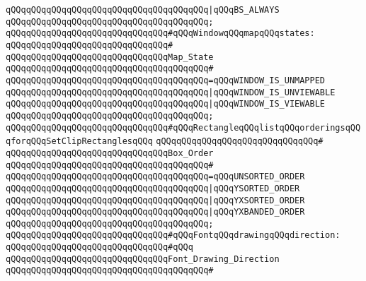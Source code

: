 \verb|qQQqqQQqqQQqqQQqqQQqqQQqqQQqqQQqqQQqqQQq|\verb#|qQQqBS_ALWAYS#\newline
\verb|qQQqqQQqqQQqqQQqqQQqqQQqqQQqqQQqqQQqqQQq;|\newline
\newline
\verb|qQQqqQQqqQQqqQQqqQQqqQQqqQQqqQQq#qQQqWindowqQQqmapqQQqstates:|\newline
\verb|qQQqqQQqqQQqqQQqqQQqqQQqqQQqqQQq#|\newline
\verb|qQQqqQQqqQQqqQQqqQQqqQQqqQQqqQQqMap_State|\newline
\verb|qQQqqQQqqQQqqQQqqQQqqQQqqQQqqQQqqQQqqQQq#|\newline
\verb|qQQqqQQqqQQqqQQqqQQqqQQqqQQqqQQqqQQqqQQq=qQQqWINDOW_IS_UNMAPPED|\newline
\verb|qQQqqQQqqQQqqQQqqQQqqQQqqQQqqQQqqQQqqQQq|\verb#|qQQqWINDOW_IS_UNVIEWABLE#\newline
\verb|qQQqqQQqqQQqqQQqqQQqqQQqqQQqqQQqqQQqqQQq|\verb#|qQQqWINDOW_IS_VIEWABLE#\newline
\verb|qQQqqQQqqQQqqQQqqQQqqQQqqQQqqQQqqQQqqQQq;|\newline
\newline
\verb|qQQqqQQqqQQqqQQqqQQqqQQqqQQqqQQq#qQQqRectangleqQQqlistqQQqorderingsqQQqforqQQqSetClipRectanglesqQQq|\newline
\verb|qQQqqQQqqQQqqQQqqQQqqQQqqQQqqQQq#|\newline
\verb|qQQqqQQqqQQqqQQqqQQqqQQqqQQqqQQqBox_Order|\newline
\verb|qQQqqQQqqQQqqQQqqQQqqQQqqQQqqQQqqQQqqQQq#|\newline
\verb|qQQqqQQqqQQqqQQqqQQqqQQqqQQqqQQqqQQqqQQq=qQQqUNSORTED_ORDER|\newline
\verb|qQQqqQQqqQQqqQQqqQQqqQQqqQQqqQQqqQQqqQQq|\verb#|qQQqYSORTED_ORDER#\newline
\verb|qQQqqQQqqQQqqQQqqQQqqQQqqQQqqQQqqQQqqQQq|\verb#|qQQqYXSORTED_ORDER#\newline
\verb|qQQqqQQqqQQqqQQqqQQqqQQqqQQqqQQqqQQqqQQq|\verb#|qQQqYXBANDED_ORDER#\newline
\verb|qQQqqQQqqQQqqQQqqQQqqQQqqQQqqQQqqQQqqQQq;|\newline
\newline
\verb|qQQqqQQqqQQqqQQqqQQqqQQqqQQqqQQq#qQQqFontqQQqdrawingqQQqdirection:|\newline
\verb|qQQqqQQqqQQqqQQqqQQqqQQqqQQqqQQq#qQQq|\newline
\verb|qQQqqQQqqQQqqQQqqQQqqQQqqQQqqQQqFont_Drawing_Direction|\newline
\verb|qQQqqQQqqQQqqQQqqQQqqQQqqQQqqQQqqQQqqQQq#|\newline
